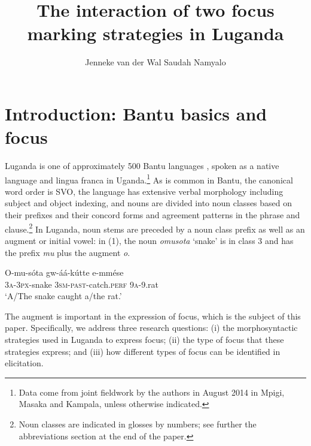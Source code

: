 \documentclass[output=paper]{langsci/langscibook}
\title{The interaction of two focus marking strategies in Luganda}
\author{%
Jenneke van der Wal \affiliation{University of Cambridge}\lastand 
 Saudah Namyalo \affiliation{Makerere University}
}
\begin{document}
 
 
%



\section{Introduction: Bantu basics and focus} 

Luganda is one of approximately 500 Bantu languages \citep[4]{NursePhilippson2003}, spoken as a native language and lingua franca in Uganda.\footnote{Data come from joint fieldwork by the authors in August 2014 in Mpigi, Masaka and Kampala, unless otherwise indicated.}{} As is common in Bantu, the canonical word order is SVO, the language has extensive verbal morphology including subject and object indexing, and nouns are divided into noun classes based on their prefixes and their concord forms and agreement patterns in the phrase and clause.\footnote{Noun classes are indicated in glosses by numbers; see further the abbreviations section at the end of the paper.}{} In Luganda, noun stems are preceded by a noun class prefix as well as an augment or initial vowel: in (1), the noun \textit{omusota} ‘snake’ is in class 3 and has the prefix \textit{mu} plus the augment \textit{o}. 

\ea
\gll O-mu-sóta  gw-áá-kútte      e-mmése\\
     \textsc{3a}-\textsc{3px}-snake  \textsc{3sm}-\textsc{past}-catch.\textsc{perf}  \textsc{9a}-9.rat\\
\glt ‘A/The snake caught a/the rat.’
\z

The augment is important in the expression of focus, which is the subject of this paper. Specifically, we address three research questions: (i) the morphosyntactic strategies used in Luganda to express focus; (ii) the type of focus that these strategies express; and (iii) how different types of focus can be identified in elicitation.
\end{document}
